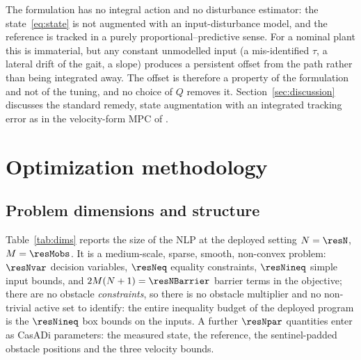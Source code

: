 \documentclass[11pt,a4paper]{article}
\begin{document}
The formulation has no integral action and no disturbance estimator: the state~\eqref{eq:state} is not
augmented with an input-disturbance model, and the reference is tracked in a purely
proportional--predictive sense. For a nominal plant this is immaterial, but any constant unmodelled input
(a mis-identified $\tau$, a lateral drift of the gait, a slope) produces a persistent offset from the path
rather than being integrated away. The offset is therefore a property of the formulation and not of the
tuning, and no choice of $Q$ removes it.
Section~\ref{sec:discussion} discusses the standard remedy, state augmentation with an integrated tracking
error as in the velocity-form MPC of \cite{rawlings2017mpc,pannocchia2003offsetfree}.

\section{Optimization methodology}
\label{sec:optproc}

\subsection{Problem dimensions and structure}
\label{sec:dims}

Table~\ref{tab:dims} reports the size of the NLP at the deployed setting $N=\resN$, $M=\resMobs$. It is a
medium-scale, sparse, smooth, non-convex problem: $\resNvar$ decision variables, $\resNeq$ equality
constraints, $\resNineq$ simple input bounds, and $2M(N+1)=\resNBarrier$ barrier terms in the objective;
there are no obstacle \emph{constraints}, so there is no obstacle multiplier and no non-trivial active set
to identify: the entire inequality budget of the deployed program is the $\resNineq$ box bounds on the
inputs. A further $\resNpar$ quantities enter as CasADi parameters: the measured state, the reference, the
sentinel-padded obstacle positions and the three velocity bounds.
\end{document}
